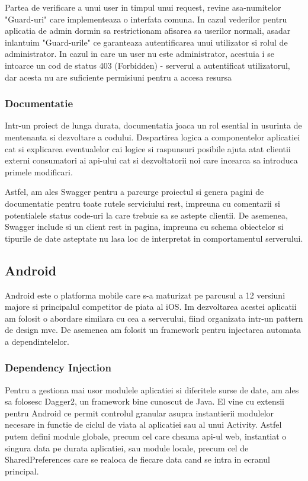 Partea de verificare a unui user in timpul unui request, revine asa-numitelor "Guard-uri" care implementeaza o interfata comuna. In cazul vederilor pentru aplicatia de admin dormin sa restrictionam afisarea sa userilor normali, asadar inlantuim "Guard-urile" ce garanteaza autentificarea unui utilizator si rolul de administrator. In cazul in care un user nu este administrator, acestuia i se intoarce un cod de status 403 (Forbidden) - serverul a autentificat utilizatorul, dar acesta nu are suficiente permisiuni pentru a accesa resursa

\subsubsection {Documentatie}

Intr-un proiect de lunga durata, documentatia joaca un rol esential in usurinta de mentenanta si dezvoltare a codului. Despartirea logica a componentelor aplicatiei cat si explicarea eventualelor cai logice si raspunsuri posibile ajuta atat clientii externi consumatori ai \acrshort{api}-ului cat si dezvoltatorii noi care incearca sa introduca primele modificari.

Astfel, am ales Swagger pentru a parcurge proiectul si genera pagini de documentatie pentru toate rutele serviciului \acrshort{rest}, impreuna cu comentarii si potentialele status code-uri la care trebuie sa se astepte clientii. De asemenea, Swagger include si un client \acrshort{rest} in pagina, impreuna cu schema obiectelor si tipurile de date asteptate nu lasa loc de interpretat in comportamentul serverului.

\subsection {Android}

Android este o platforma mobile care s-a maturizat pe parcusul a 12 versiuni majore si principalul competitor de piata al iOS. Im dezvoltarea acestei aplicatii am folosit o abordare similara cu cea a serverului, fiind organizata intr-un pattern de design \acrshort{mvc}. De asemenea am folosit un framework pentru injectarea automata a dependintelelor.

\subsubsection {Dependency Injection}

Pentru a gestiona mai usor modulele aplicatiei si diferitele surse de date, am ales sa folosesc Dagger2, un framework bine cunoscut de Java. El vine cu extensii pentru Android ce permit controlul granular asupra instantierii modulelor necesare in functie de ciclul de viata al aplicatiei sau al unui Activity. Astfel putem defini module globale, precum cel care cheama api-ul web, instantiat o singura data pe durata aplicatiei, sau module locale, precum cel de SharedPreferences care se realoca de fiecare data cand se intra in ecranul principal.

